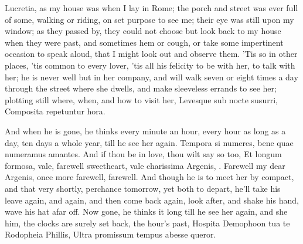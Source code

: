 {Lucretia, as my house was when I lay in Rome; the porch and street was
ever full of some, walking or riding, on set purpose to see me; their
eye was still upon my window; as they passed by, they could not choose
but look back to my house when they were past, and sometimes hem or
cough, or take some impertinent occasion to speak aloud, that I might
look out and observe them. 'Tis so in other places, 'tis common to
every lover, 'tis all his felicity to be with her, to talk with her; he
is never well but in her company, and will walk  seven or eight
times a day through the street where she dwells, and make sleeveless
errands to see her; plotting still where, when, and how to visit her,
Levesque sub nocte susurri,
Composita repetuntur hora.

And when he is gone, he thinks every minute an hour, every hour as long
as a day, ten days a whole year, till he see her again. Tempora
si numeres, bene quae numeramus amantes. And if thou be in love, thou
wilt say so too, Et longum formosa, vale, farewell sweetheart, vale
charissima Argenis, \etc{}. Farewell my dear Argenis, once more farewell,
farewell. And though he is to meet her by compact, and that very
shortly, perchance tomorrow, yet both to depart, he'll take his leave
again, and again, and then come back again, look after, and shake his
hand, wave his hat afar off. Now gone, he thinks it long till he see
her again, and she him, the clocks are surely set back, the hour's
past,
Hospita Demophoon tua te Rodopheia Phillis,
Ultra promissum tempus abesse queror.

}
